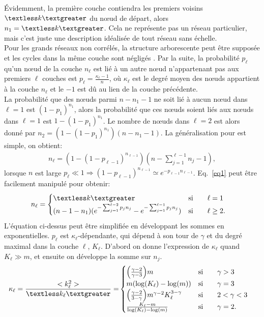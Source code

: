 Évidemment, la première couche contiendra les premiers voisins $\km$ du nœud de départ, alors $n_1=\km$. Cela ne représente pas un réseau particulier, mais c'est juste une description idéalisée de tout réseau sans échelle. \\
Pour les grands réseaux non corrélés, la structure arborescente peut être supposée et les cycles dans la même couche sont négligés \cite{Cohen-Havlin2003,Cohen-Havlin2009}. Par la suite, la probabilité $ p_{\ell} $ qu'un nœud de la couche $n_\ell$ est lié à un autre nœud n'appartenant pas aux premiers $\ell$ couches est $p_{\ell}=\frac{\kappa_{\ell}-1}{n}$, où $\kappa_{\ell}$ est le degré moyen des nœuds appartient à la couche $n_\ell$ et le $-1$ est dû au lien de la couche précédente. \\
La probabilité que des nœuds parmi $n-n_1-1$ ne soit lié à aucun nœud dans $\ell=1$ est $(1-p_1)^{n_1}$, alors la probabilité que ces nœuds soient liés aux nœuds dans $\ell=1$ est $1-(1-p_1)^{n_1}$. Le nombre de nœuds dans $\ell=2$ est alors donné par $n_2=(1- (1-p_1)^{n_1})(n-n_1-1)$. La généralisation pour \nl est simple, on obtient:
\begin{align}
n_{\ell}= (1-(1-p_{\ell-1})^{n_{\ell-1}})(n-\sum_{j=1}^{\ell-1} n_j-1),
\label{eq1}
\end{align}
lorsque $n$ est large $p_{\ell}\ll1 \Longrightarrow (1-p_{\ell-1})^{n_{\ell-1}}\simeq e^{-p_{\ell-1}n_{\ell-1}} $. Eq.~\eqref{eq1}
peut être facilement manipulé pour obtenir:
\begin{align}
n_{\ell} &=
\begin{cases}
\km & \text{si}\qquad \ell=1 \\
(n-1-n_1)(e^{-\sum_{j=1}^{\ell-2}p_j n_j}-e^{-\sum_{j=1}^{\ell-1}p_j n_j}) & \text{si}\qquad \ell \ge 2.
\end{cases}
\label{eq2}
\end{align}
L'équation ci-dessus peut être simplifiée en développant les sommes en exponentielles. $p_{\ell}$ est $\kappa_{\ell}$-dépendante, qui dépend à son tour de $\gamma$ et du degré maximal dans la couche $\ell$, $K_{\ell}$. D'abord on donne l'expression de $\kappa_{\ell}$ quand $K_{\ell}\gg m$, et ensuite on développe la somme sur $n_j$.
\begin{align}
\kappa_{\ell} =\frac{<k_{\ell}^2>}{\textless k_{\ell} \textgreater}=&
\begin{cases}
\Big(\frac{\gamma-2}{\gamma-3}\Big)m & \text{si} \qquad \gamma >3 \\ 
m (\log(K_{\ell})-\log(m))  & \text{si} \qquad \gamma =3 \\
\Big(\frac{\gamma-2}{3-\gamma}\Big)m^{\gamma-2} K_{\ell}^{3-\gamma}  & \text{si} \qquad 2<\gamma<3 \\
\frac{K_{\ell}-m}{\log(K_{\ell})-\log(m)} & \text{si} \qquad \gamma=2.
\end{cases}
\label{eq4}
\end{align}

